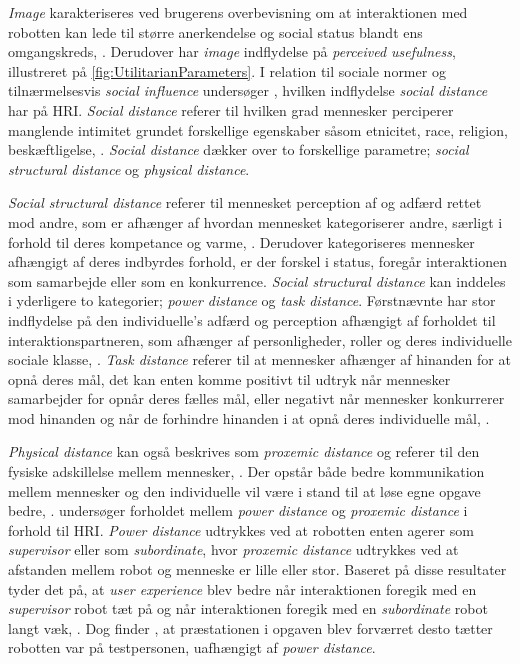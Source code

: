 \textit{Image} karakteriseres ved brugerens overbevisning om at interaktionen med robotten kan lede til større anerkendelse og social status blandt ens omgangskreds, \parencite[s. 1478]{PDF:ExploringInfluencingVariable}. Derudover har \textit{image} indflydelse på \textit{perceived usefulness}, illustreret på \autoref{fig:UtilitarianParameters}.\blankline
%
I relation til sociale normer og tilnærmelsesvis \textit{social influence} undersøger \textcite{PDF:HowSocialDistanceShapesHRI}, hvilken indflydelse \textit{social distance} har på HRI. \textit{Social distance} referer til hvilken grad mennesker perciperer manglende intimitet grundet forskellige egenskaber såsom etnicitet, race, religion, beskæftligelse, \parencite[s. 784]{PDF:HowSocialDistanceShapesHRI}. \textit{Social distance} dækker over to forskellige parametre; \textit{social structural distance} og \textit{physical distance}.

\textit{Social structural distance} referer til mennesket perception af og adfærd rettet mod andre, som er afhænger af hvordan mennesket kategoriserer andre, særligt i forhold til deres kompetance og varme, \parencite[s. 784]{PDF:HowSocialDistanceShapesHRI}. Derudover kategoriseres mennesker afhængigt af deres indbyrdes forhold, er der forskel i status, foregår interaktionen som samarbejde eller som en konkurrence. \textit{Social structural distance} kan inddeles i yderligere to kategorier; \textit{power distance} og \textit{task distance}. Førstnævnte har stor indflydelse på den individuelle's adfærd og perception afhængigt af forholdet til interaktionspartneren, som afhænger af personligheder, roller og deres individuelle sociale klasse, \parencite[s. 784]{PDF:HowSocialDistanceShapesHRI}. \textit{Task distance} referer til at mennesker afhænger af hinanden for at opnå deres mål, det kan enten komme positivt til udtryk når mennesker samarbejder for opnår deres fælles mål, eller negativt når mennesker konkurrerer mod hinanden og når de forhindre hinanden i at opnå deres individuelle mål, \parencite[s. 784]{PDF:HowSocialDistanceShapesHRI}. 

\textit{Physical distance} kan også beskrives som \textit{proxemic distance} og referer til den fysiske adskillelse mellem mennesker, \parencite[s. 784]{PDF:HowSocialDistanceShapesHRI}. Der opstår både bedre kommunikation mellem mennesker og den individuelle vil være i stand til at løse egne opgave bedre, \parencite[s. 785]{PDF:HowSocialDistanceShapesHRI}.\blankline
%
\textcite[s. 794]{PDF:HowSocialDistanceShapesHRI} undersøger forholdet mellem \textit{power distance} og \textit{proxemic distance} i forhold til HRI. \textit{Power distance} udtrykkes ved at robotten enten agerer som \textit{supervisor} eller som \textit{subordinate}, hvor \textit{proxemic distance} udtrykkes ved at afstanden mellem robot og menneske er lille eller stor. Baseret på disse resultater tyder det på, at \textit{user experience} blev bedre når interaktionen foregik med en \textit{supervisor} robot tæt på og når interaktionen foregik med en \textit{subordinate} robot langt væk, \parencite[s. 785]{PDF:HowSocialDistanceShapesHRI}. Dog finder \textcite[s. 785]{PDF:HowSocialDistanceShapesHRI}, at præstationen i opgaven blev forværret desto tætter robotten var på testpersonen, uafhængigt af \textit{power distance}. 

